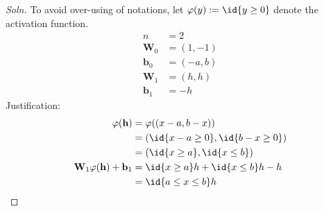 \documentclass{article}
\begin{document}
	\subsubsection{}
	\begin{proof}[Soln]
		To avoid over-using of notations, let $\varphi(y) := \id{y \geq 0}$ denote the activation function.
		\begin{align}
			n &= 2 \\
			\textbf{W}_0 &= (1, -1) \\
			\textbf{b}_0 &= (-a, b) \\
			\textbf{W}_1 &= (h, h) \\
			\textbf{b}_1 &= - h
		\end{align}
		Justification:
		\begin{align}
			\varphi(\textbf{h}) &= \varphi((x - a, b - x)) \\
			&= (\id{x-a \geq 0}, \id{b-x \geq 0}) \\
			&= (\id{x \geq a}, \id{x \leq b}) \\
			\textbf{W}_1 \varphi(\textbf{h}) + \textbf{b}_1
			&=\id{x \geq a} h + \id{x \leq b} h - h \\
			&=\id{a \leq x \leq b} h
		\end{align}
	\end{proof}
\end{document}
